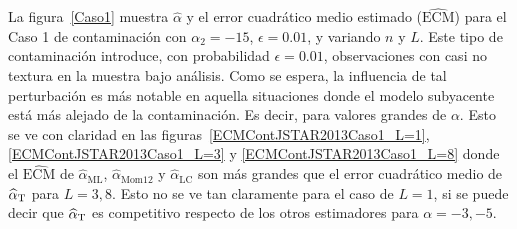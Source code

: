 
La figura~\ref{Caso1} muestra $\widehat{\alpha}$ y el error cuadrático medio estimado ($\widehat{\text{ECM}}$) para el Caso 1 de contaminación con $\alpha_2=-15$, $\epsilon=0.01$, y variando $n$ y $L$.  
Este tipo de contaminación introduce, con probabilidad $\epsilon=0.01$, observaciones con casi no textura en la muestra bajo análisis. Como se espera, la influencia de tal perturbación es más notable en aquella situaciones donde el modelo subyacente está más alejado de la contaminación. Es decir, para valores grandes de $\alpha$. Esto se ve con claridad en las figuras~\ref{ECMContJSTAR2013Caso1_L=1},\ref{ECMContJSTAR2013Caso1_L=3} y \ref{ECMContJSTAR2013Caso1_L=8} donde el $\widehat{\text{ECM}}$ de $\widehat\alpha_{\text{ML}}$, $\widehat\alpha_{\text{Mom12}}$ y $\widehat\alpha_{\text{LC}}$ son más grandes que el error cuadrático medio de $\widehat\alpha_{\text T}$ para $L=3,8$. Esto no se ve tan claramente para el caso de $L=1$, si se puede decir que $\widehat\alpha_{\text T}$ es competitivo respecto de los otros estimadores para $\alpha=-3,-5$.


